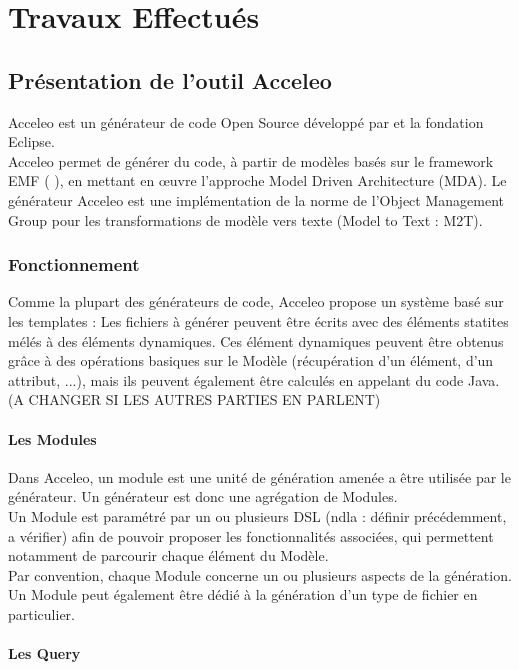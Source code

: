\chapter{Travaux Effectués}\label{chap:tra}

\section{Présentation de l'outil Acceleo}

Acceleo est un générateur de code Open Source développé par \kwobeo{} et la fondation Eclipse.
\\
Acceleo permet de générer du code, à partir de modèles basés sur le framework EMF (\cf{} \cite{emf}), en mettant en œuvre l'approche Model Driven Architecture (MDA). Le générateur Acceleo est une implémentation de la norme de l'Object Management Group \cite{omg} pour les transformations de modèle vers texte (Model to Text : M2T).

\subsection{Fonctionnement}

Comme la plupart des générateurs de code, Acceleo propose un système basé sur les templates : Les fichiers à générer peuvent être écrits avec des éléments statites mélés à des éléments dynamiques. Ces élément dynamiques peuvent être obtenus grâce à des opérations basiques sur le Modèle (récupération d'un élément, d'un attribut, ...), mais ils peuvent également être calculés en appelant du code Java.
(A CHANGER SI LES AUTRES PARTIES EN PARLENT)

\subsubsection{Les Modules}

Dans Acceleo, un module est une unité de génération amenée a être utilisée par le générateur. Un générateur est donc une agrégation de Modules.
\\
Un Module est paramétré par un ou plusieurs DSL (ndla : définir précédemment, a vérifier) afin de pouvoir proposer les fonctionnalités associées, qui permettent notamment de parcourir chaque élément du Modèle.
\\
Par convention, chaque Module concerne un ou plusieurs aspects de la génération. Un Module peut également être dédié à la génération d'un type de fichier en particulier.


\subsubsection{Les Query}


